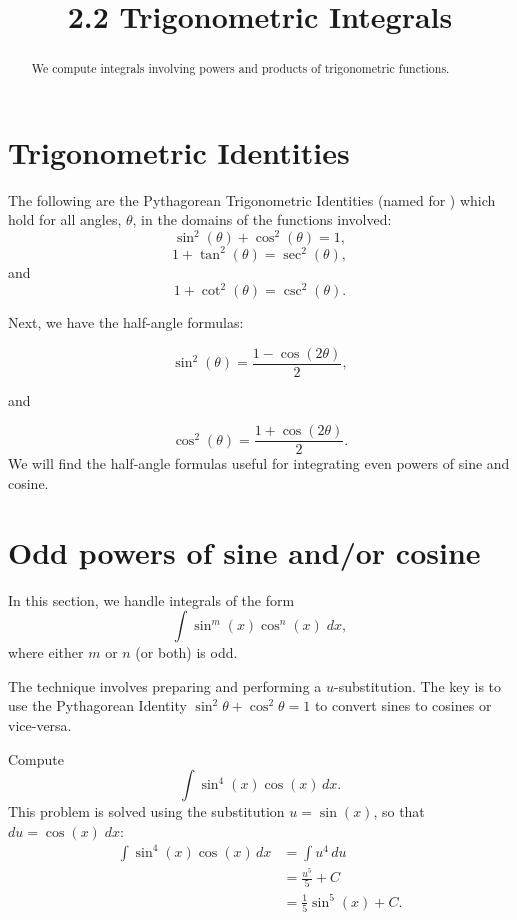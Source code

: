 \documentclass{ximera}
\title{2.2 Trigonometric Integrals}
\begin{document}
\begin{abstract}
We compute integrals involving powers and products of trigonometric functions.
\end{abstract}

\maketitle

\section{Trigonometric Identities}

The following are the Pythagorean Trigonometric Identities (named for ) which hold for all angles,
$\theta$, in the domains of the functions involved:
\[
\sin^2(\theta) + \cos^2(\theta) = 1,
\]
\[
1 + \tan^2(\theta) = \sec^2(\theta),
\]
and
\[
1 + \cot^2(\theta) = \csc^2(\theta).
\]

Next, we have the half-angle formulas:

\[
\sin^2(\theta) = \frac{1-\cos(2\theta)}{2},
\]

and

\[
\cos^2(\theta) = \frac{1+\cos(2\theta)}{2}.
\]
We will find the half-angle formulas useful for integrating even powers of sine and cosine.

\section{Odd powers of sine and/or cosine}

In this section, we handle integrals of the form
\[
\int \sin^m(x) \cos^n(x) \; dx,
\]
where either $m$ or $n$ (or both) is odd.

The technique involves preparing and performing a $u$-substitution. The key is to use the Pythagorean 
Identity $\sin^2 \theta + \cos^2 \theta = 1$ to convert
sines to cosines or vice-versa.

\begin{example}[example 1]
Compute
\[
\int \sin^4(x) \cos(x) \, dx.
\]
This problem is solved using the substitution $u = \sin(x)$, so that $du = \cos(x) \; dx$:
\begin{align*}
\int \sin^4(x) \cos(x) \, dx &= \int u^4 \, du\\
                             &= \frac{u^5}{5} + C\\
                             &= \frac15 \sin^5(x) + C.
\end{align*}

\end{example}
\end{document}
